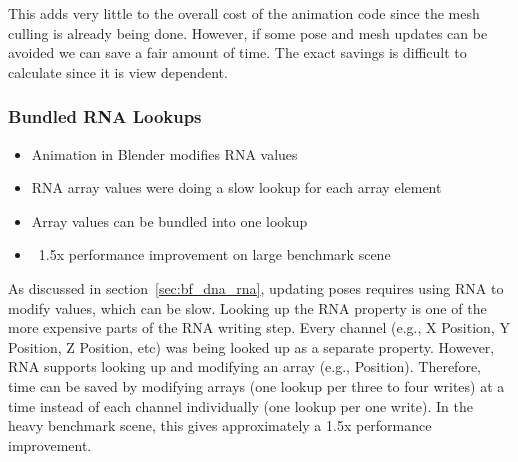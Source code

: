 
This adds very little to the overall cost of the animation code since the mesh culling is already being done. However, if some pose and mesh updates can be avoided we can save a fair amount of time. The exact savings is difficult to calculate since it is view dependent. 

\subsubsection{Bundled RNA Lookups}
\begin{itemize}
 \item Animation in Blender modifies RNA values
 \item RNA array values were doing a slow lookup for each array element
 \item Array values can be bundled into one lookup
 \item ~1.5x performance improvement on large benchmark scene
\end{itemize}

As discussed in section~\ref{sec:bf_dna_rna}, updating poses requires using RNA to modify values, which can be slow. Looking up the RNA property is one of the more expensive parts of the RNA writing step. Every channel (e.g., X Position, Y Position, Z Position, etc) was being looked up as a separate property. However, RNA supports looking up and modifying an array (e.g., Position). Therefore, time can be saved by modifying arrays (one lookup per three to four writes) at a time instead of each channel individually (one lookup per one write). In the heavy benchmark scene, this gives approximately a 1.5x performance improvement.

